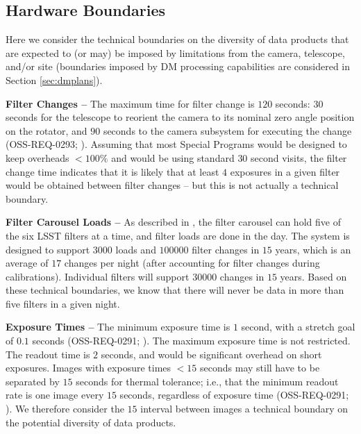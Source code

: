 \documentclass[DM,lsstdoc,toc]{lsstdoc}
\begin{document}
\subsection{Hardware Boundaries}\label{ssec:data_bounds}

Here we consider the technical boundaries on the diversity of data products that are expected to (or may) be imposed by limitations from the camera, telescope, and/or site (boundaries imposed by DM processing capabilities are considered in Section \ref{sec:dmplans}). 

{\bf Filter Changes -- } The maximum time for filter change is $120$ seconds: $30$ seconds for the telescope to reorient the camera to its nominal zero angle position on the rotator, and $90$ seconds to the camera subsystem for executing the change (OSS-REQ-0293; ). Assuming that most Special Programs would be designed to keep overheads $<100\%$ and would be using standard $30$ second visits, the filter change time indicates that it is likely that at least $4$ exposures in a given filter would be obtained between filter changes -- but this is not actually a technical boundary. 

{\bf Filter Carousel Loads -- } As described in , the filter carousel can hold five of the six LSST filters at a time, and filter loads are done in the day. The system is designed to support $3000$ loads and $100000$ filter changes in $15$ years, which is an average of $17$ changes per night (after accounting for filter changes during calibrations). Individual filters will support $30000$ changes in $15$ years. Based on these technical boundaries, we know that there will never be data in more than five filters in a given night.

{\bf Exposure Times -- } The minimum exposure time is $1$ second, with a stretch goal of $0.1$ seconds (OSS-REQ-0291; ). The maximum exposure time is not restricted. The readout time is $2$ seconds, and would be significant overhead on short exposures. Images with exposure times $<15$ seconds may still have to be separated by $15$ seconds for thermal tolerance; i.e., that the minimum readout rate is one image every $15$ seconds, regardless of exposure time (OSS-REQ-0291; ). We therefore consider the $15$ interval between images a technical boundary on the potential diversity of data products.
\end{document}
